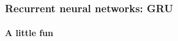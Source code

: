 \documentclass[xcolor=table]{beamer}
\begin{document}
\begin{frame}
	\frametitle{Recurrent neural networks: GRU}
	\framesubtitle{A little fun}
	
	\begin{center}
	\end{center}
	
\end{frame}

\end{document}
